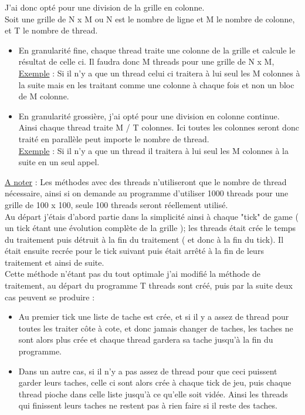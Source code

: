 \documentclass[10pt,a4paper]{article}
\begin{document}
J'ai donc opté pour une division de la grille en colonne. \\

Soit une grille de N x M ou N est le nombre de ligne et M le nombre de colonne, et T le nombre de thread.
\begin{itemize}
    \item En granularité fine, chaque thread traite une colonne de la grille et calcule le résultat de celle ci. Il faudra donc M threads pour une grille de N x M,  \\
    \underline{Exemple} : Si il n'y a que un thread celui ci traitera à lui seul les M colonnes à la suite mais en les traitant comme une colonne à chaque fois et non un bloc de M colonne.\\
    
    \item En granularité grossière, j'ai opté pour une division en colonne continue. \\
    Ainsi chaque thread traite M / T colonnes. Ici toutes les colonnes seront donc traité en parallèle peut importe le nombre de thread. \\
    \underline{Exemple} : Si il n'y a que un thread il traitera à lui seul les M colonnes à la suite en un seul appel.
\end{itemize}
\hfill\break
\underline{A noter} : Les méthodes avec des threads n'utiliseront que le nombre de thread nécessaire, ainsi si on demande au programme d'utiliser 1000 threads pour une grille de 100 x 100, seule 100 threads seront réellement utilisé. \\

Au départ j'étais d'abord partie dans la simplicité ainsi à chaque "tick" de game ( un tick étant une évolution complète de la grille ); les threads était crée le temps du traitement puis détruit à la fin du traitement ( et donc à la fin du tick). 
Il était ensuite recrée pour le tick suivant puis était arrêté à la fin de leurs traitement et ainsi de suite. \\

Cette méthode n'étant pas du tout optimale j'ai modifié la méthode de traitement, au départ du programme T threads sont créé, puis par la suite deux cas peuvent se produire :
\begin{itemize}
    \item Au premier tick une liste de tache est crée, et si il y a assez de thread pour toutes les traiter côte à cote, et donc jamais changer de taches, les taches ne sont alors plus crée et chaque thread gardera sa tache jusqu'à la fin du programme.
    \item Dans un autre cas, si il n'y a pas assez de thread pour que ceci puissent garder leurs taches, celle ci sont alors crée à chaque tick de jeu, puis chaque thread pioche dans celle liste jusqu'à ce qu'elle soit vidée. Ainsi les threads qui finissent leurs taches ne restent pas à rien faire si il reste des taches.
\end{itemize}
\end{document}
